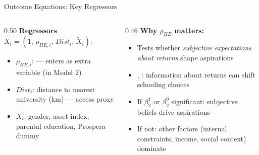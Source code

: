 \documentclass[aspectratio=169, 10pt]{beamer}
\begin{document}
\begin{frame}{Outcome Equations: Key Regressors}
  \begin{columns}
    \begin{column}{0.50\textwidth}
      \textbf{Regressors} $X_i = (1,\, \rho_{HE,i},\, \mathit{Dist}_i,\, \tilde{X}_i)$:
      \begin{itemize}
        \item $\rho_{HE,i}$:  — enters as extra variable (in Model 2)
        \item $\mathit{Dist}_i$: distance to nearest university (km) — access proxy
        \item $\tilde{X}_i$: gender, asset index, parental education, Prospera dummy
      \end{itemize}
    \end{column}
    \begin{column}{0.46\textwidth}
      \textbf{Why $\rho_{HE}$ matters:}
      \begin{itemize}
        \item Tests whether \textit{subjective expectations about returns} shape aspirations
        \item \citet{Jensen2010}, \citet{Nguyen2008}: information about returns can shift schooling choices
        \item If $\beta^1_2$ or $\beta^0_2$ significant: subjective beliefs drive aspirations
        \item If not: other factors (internal constraints, income, social context) dominate
      \end{itemize}
    \end{column}
  \end{columns}
\end{frame}
\end{document}
